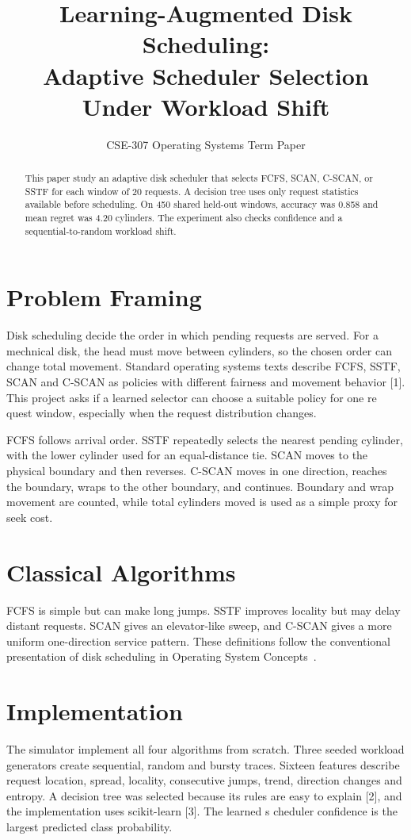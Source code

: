 \documentclass[10pt,a4paper]{article}
\title{\vspace{-1.5em}Learning-Augmented Disk Scheduling:\\Adaptive Scheduler Selection Under Workload Shift}
\author{CSE-307 Operating Systems Term Paper}
\date{}
\begin{document}
\maketitle
\vspace{-1.5em}
\begin{abstract}This paper study an adaptive disk scheduler that selects FCFS, SCAN, C-SCAN, or SSTF for each window of 20 requests. A decision tree uses only request statistics available before scheduling. On 450 shared held-out windows, accuracy was 0.858 and mean regret was 4.20 cylinders. The experiment also checks confidence and a sequential-to-random workload shift.\end{abstract}
\section{Problem Framing}
Disk scheduling decide the order in which pending requests are served. For a mechnical disk, the head must move between cylinders, so the chosen order can change total movement. Standard operating systems texts describe FCFS, SSTF, SCAN and C-SCAN as policies with different fairness and movement behavior [1]. This project asks if a learned selector can choose a suitable policy for one re quest window, especially when the request distribution changes.

FCFS follows arrival order. SSTF repeatedly selects the nearest pending cylinder, with the lower cylinder used for an equal-distance tie. SCAN moves to the physical boundary and then reverses. C-SCAN moves in one direction, reaches the boundary, wraps to the other boundary, and continues. Boundary and wrap movement are counted, while total cylinders moved is used as a simple proxy for seek cost.
\section{Classical Algorithms}
FCFS is simple but can make long jumps. SSTF improves locality but may delay distant requests. SCAN gives an elevator-like sweep, and C-SCAN gives a more uniform one-direction service pattern. These definitions follow the conventional presentation of disk scheduling in Operating System Concepts~\cite{silberschatz2018}.
\newpage
\section{Implementation}
The simulator implement all four algorithms from scratch. Three seeded workload generators create sequential, random and bursty traces. Sixteen features describe request location, spread, locality, consecutive jumps, trend, direction changes and entropy. A decision tree was selected because its rules are easy to explain [2], and the implementation uses scikit-learn [3]. The learned s cheduler confidence is the largest predicted class probability.
\end{document}
